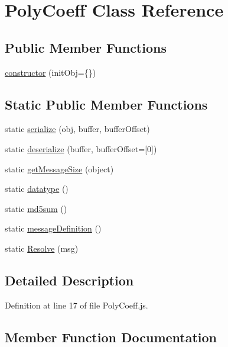 \hypertarget{class_poly_coeff}{}\section{Poly\+Coeff Class Reference}
\label{class_poly_coeff}
\subsection*{Public Member Functions}
\begin{DoxyCompactItemize}
\item 
\hyperlink{class_poly_coeff_a8a80e6810adbb663d71b9f71b7ad2a7c}{constructor} (init\+Obj=\{\})
\end{DoxyCompactItemize}
\subsection*{Static Public Member Functions}
\begin{DoxyCompactItemize}
\item 
static \hyperlink{class_poly_coeff_abf599ef0796cb098be2d69384cc4b304}{serialize} (obj, buffer, buffer\+Offset)
\item 
static \hyperlink{class_poly_coeff_afa6dfaa75f4206133f83492242e38555}{deserialize} (buffer, buffer\+Offset=\mbox{[}0\mbox{]})
\item 
static \hyperlink{class_poly_coeff_a5f576ec0a592120d05cdb81a4c69a10b}{get\+Message\+Size} (object)
\item 
static \hyperlink{class_poly_coeff_a3919404900b2c0bf694f29e00ac84af9}{datatype} ()
\item 
static \hyperlink{class_poly_coeff_a2ca69323b5cd3ff6d10cec628209b68a}{md5sum} ()
\item 
static \hyperlink{class_poly_coeff_a50b195b5e9de1005eaead0c2b9267ba1}{message\+Definition} ()
\item 
static \hyperlink{class_poly_coeff_a17fccc770e97c66e2c5a6994ed6e5952}{Resolve} (msg)
\end{DoxyCompactItemize}


\subsection{Detailed Description}


Definition at line 17 of file Poly\+Coeff.\+js.



\subsection{Member Function Documentation}
